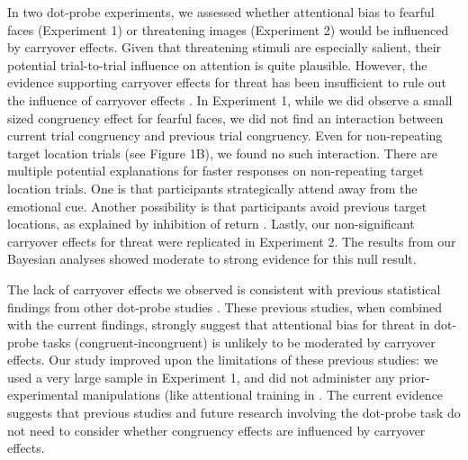 \documentclass{article}
\begin{document}
	In two dot-probe experiments, we assessed whether attentional bias to fearful faces (Experiment 1) or threatening images (Experiment 2) would be influenced by carryover effects. Given that threatening stimuli are especially salient, their potential trial-to-trial influence on attention is quite plausible. However, the evidence supporting carryover effects for threat has been insufficient to rule out the influence of carryover effects \textcite{[object Object], [object Object]}. In Experiment 1, while we did observe a small sized congruency effect for fearful faces, we did not find an interaction between current trial congruency and previous trial congruency. Even for non-repeating target location trials (see Figure 1B), we found no such interaction. {\color{4472C4}There are multiple potential explanations for faster responses on non-repeating target location trials. }{\color{4472C4}One is that participants strategically attend away from the emotional cue. }{\color{4472C4}Another possibility is that participants avoid previous target locations, as explained by inhibition of return }\textcite{[object Object]}{\color{4472C4}. }Lastly, our non-significant carryover effects for threat were replicated in Experiment 2. The results from our Bayesian analyses showed moderate to strong evidence for this null result.



	The lack of carryover effects we observed is consistent with {\color{4472C4}previous statistical findings from other dot}-probe studies \textcite{[object Object], [object Object]}\textcite{[object Object]}. These previous studies, when combined with the current findings, strongly suggest that attentional bias for threat in dot-probe tasks (congruent-incongruent) is unlikely to be moderated by carryover effects. Our study improved upon the limitations of these previous studies: we used a very large sample in Experiment 1, and did not administer any prior-experimental manipulations (like attentional training in \textcite{[object Object]}. The current evidence suggests that previous studies and future research involving the dot-probe task do not need to consider whether congruency effects are influenced by carryover effects.
\end{document}
